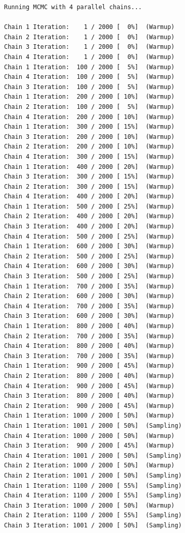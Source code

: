 \documentclass[
  13,
  letterpaper,
]{report}
\begin{document}
\begin{verbatim}
Running MCMC with 4 parallel chains...

Chain 1 Iteration:    1 / 2000 [  0%]  (Warmup) 
Chain 2 Iteration:    1 / 2000 [  0%]  (Warmup) 
Chain 3 Iteration:    1 / 2000 [  0%]  (Warmup) 
Chain 4 Iteration:    1 / 2000 [  0%]  (Warmup) 
Chain 1 Iteration:  100 / 2000 [  5%]  (Warmup) 
Chain 4 Iteration:  100 / 2000 [  5%]  (Warmup) 
Chain 3 Iteration:  100 / 2000 [  5%]  (Warmup) 
Chain 1 Iteration:  200 / 2000 [ 10%]  (Warmup) 
Chain 2 Iteration:  100 / 2000 [  5%]  (Warmup) 
Chain 4 Iteration:  200 / 2000 [ 10%]  (Warmup) 
Chain 1 Iteration:  300 / 2000 [ 15%]  (Warmup) 
Chain 3 Iteration:  200 / 2000 [ 10%]  (Warmup) 
Chain 2 Iteration:  200 / 2000 [ 10%]  (Warmup) 
Chain 4 Iteration:  300 / 2000 [ 15%]  (Warmup) 
Chain 1 Iteration:  400 / 2000 [ 20%]  (Warmup) 
Chain 3 Iteration:  300 / 2000 [ 15%]  (Warmup) 
Chain 2 Iteration:  300 / 2000 [ 15%]  (Warmup) 
Chain 4 Iteration:  400 / 2000 [ 20%]  (Warmup) 
Chain 1 Iteration:  500 / 2000 [ 25%]  (Warmup) 
Chain 2 Iteration:  400 / 2000 [ 20%]  (Warmup) 
Chain 3 Iteration:  400 / 2000 [ 20%]  (Warmup) 
Chain 4 Iteration:  500 / 2000 [ 25%]  (Warmup) 
Chain 1 Iteration:  600 / 2000 [ 30%]  (Warmup) 
Chain 2 Iteration:  500 / 2000 [ 25%]  (Warmup) 
Chain 4 Iteration:  600 / 2000 [ 30%]  (Warmup) 
Chain 3 Iteration:  500 / 2000 [ 25%]  (Warmup) 
Chain 1 Iteration:  700 / 2000 [ 35%]  (Warmup) 
Chain 2 Iteration:  600 / 2000 [ 30%]  (Warmup) 
Chain 4 Iteration:  700 / 2000 [ 35%]  (Warmup) 
Chain 3 Iteration:  600 / 2000 [ 30%]  (Warmup) 
Chain 1 Iteration:  800 / 2000 [ 40%]  (Warmup) 
Chain 2 Iteration:  700 / 2000 [ 35%]  (Warmup) 
Chain 4 Iteration:  800 / 2000 [ 40%]  (Warmup) 
Chain 3 Iteration:  700 / 2000 [ 35%]  (Warmup) 
Chain 1 Iteration:  900 / 2000 [ 45%]  (Warmup) 
Chain 2 Iteration:  800 / 2000 [ 40%]  (Warmup) 
Chain 4 Iteration:  900 / 2000 [ 45%]  (Warmup) 
Chain 3 Iteration:  800 / 2000 [ 40%]  (Warmup) 
Chain 2 Iteration:  900 / 2000 [ 45%]  (Warmup) 
Chain 1 Iteration: 1000 / 2000 [ 50%]  (Warmup) 
Chain 1 Iteration: 1001 / 2000 [ 50%]  (Sampling) 
Chain 4 Iteration: 1000 / 2000 [ 50%]  (Warmup) 
Chain 3 Iteration:  900 / 2000 [ 45%]  (Warmup) 
Chain 4 Iteration: 1001 / 2000 [ 50%]  (Sampling) 
Chain 2 Iteration: 1000 / 2000 [ 50%]  (Warmup) 
Chain 2 Iteration: 1001 / 2000 [ 50%]  (Sampling) 
Chain 1 Iteration: 1100 / 2000 [ 55%]  (Sampling) 
Chain 4 Iteration: 1100 / 2000 [ 55%]  (Sampling) 
Chain 3 Iteration: 1000 / 2000 [ 50%]  (Warmup) 
Chain 2 Iteration: 1100 / 2000 [ 55%]  (Sampling) 
Chain 3 Iteration: 1001 / 2000 [ 50%]  (Sampling) 

\end{verbatim}
\end{document}
